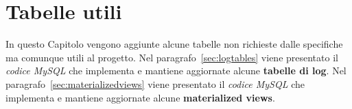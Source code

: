 \chapter{Tabelle utili}
In questo Capitolo vengono aggiunte alcune tabelle non richieste dalle specifiche ma
comunque utili al progetto. Nel paragrafo~\vref{sec:logtables} viene presentato il
{\it codice MySQL} che implementa e mantiene aggiornate alcune {\bf tabelle di log}. %
Nel paragrafo~\vref{sec:materializedviews} viene presentato
il {\it codice MySQL} che implementa e mantiene aggiornate alcune {\bf materialized views}.

%

